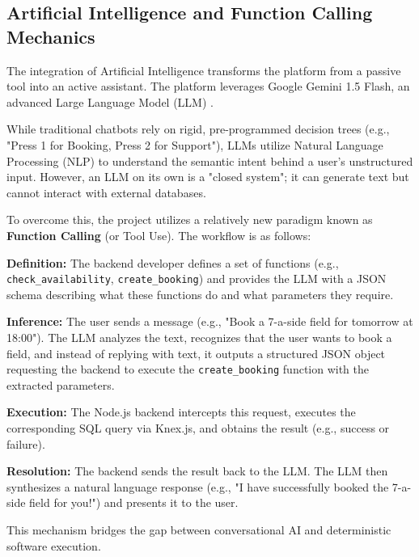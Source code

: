 \subsection{Artificial Intelligence and Function Calling Mechanics}
The integration of Artificial Intelligence transforms the platform from a passive tool into an active assistant. The platform leverages Google Gemini 1.5 Flash, an advanced Large Language Model (LLM) \cite{gemini_api}. 

While traditional chatbots rely on rigid, pre-programmed decision trees (e.g., "Press 1 for Booking, Press 2 for Support"), LLMs utilize Natural Language Processing (NLP) to understand the semantic intent behind a user's unstructured input. However, an LLM on its own is a "closed system"; it can generate text but cannot interact with external databases.

To overcome this, the project utilizes a relatively new paradigm known as \textbf{Function Calling} (or Tool Use). The workflow is as follows:
\begin{enumerate}
    \begin{sloppypar}
    \item \textbf{Definition:} The backend developer defines a set of functions (e.g., \texttt{check\_availability}, \texttt{create\_booking}) and provides the LLM with a JSON schema describing what these functions do and what parameters they require.
    \end{sloppypar}
    \item \textbf{Inference:} The user sends a message (e.g., "Book a 7-a-side field for tomorrow at 18:00"). The LLM analyzes the text, recognizes that the user wants to book a field, and instead of replying with text, it outputs a structured JSON object requesting the backend to execute the \texttt{create\_booking} function with the extracted parameters.
    \item \textbf{Execution:} The Node.js backend intercepts this request, executes the corresponding SQL query via Knex.js, and obtains the result (e.g., success or failure).
    \item \textbf{Resolution:} The backend sends the result back to the LLM. The LLM then synthesizes a natural language response (e.g., "I have successfully booked the 7-a-side field for you!") and presents it to the user.
\end{enumerate}
This mechanism bridges the gap between conversational AI and deterministic software execution.

